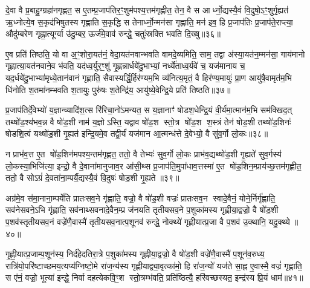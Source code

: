 {\anuvakamend[{द॒भ्नो॒त्यन॑भिषुतस्य गृह्णा॒त्येका॒न्नविꣳ॑श॒तिश्च॑॥९॥}]}

दे॒वा वै प्र॒बाहु॒ग्ग्रहा॑नगृह्णत॒ स ए॒तम्प्र॒जाप॑तिर॒ꣳ॒शुम॑पश्य॒त्तम॑गृह्णीत॒ तेन॒ वै स आर्ध्नो॒द्यस्यै॒वं वि॒दुषो॒ऽꣳ॒शुर्गृ॒ह्यत॑ ऋ॒ध्नोत्ये॒व स॒कृद॑भिषुतस्य गृह्णाति स॒कृद्धि स तेनार्ध्नो॒न्मन॑सा गृह्णाति॒ मन॑ इव॒ हि प्र॒जाप॑तिः प्र॒जाप॑ते॒राप्त्या॒ औदु॑म्बरेण गृह्णा॒त्यूर्ग्वा उ॑दु॒म्बर॒ ऊर्ज॑मे॒वाव॑ रुन्द्धे॒ चतुः॑स्रक्ति भवति दि॒ख्षु॥३६॥

ए॒व प्रति॑ तिष्ठति॒ यो वा अ॒ꣳ॒शोरा॒यत॑नं॒ वेदा॒यत॑नवान्भवति वामदे॒व्यमिति॒ साम॒ तद्वा अ॑स्या॒यत॑न॒म्मन॑सा॒ गाय॑मानो गृह्णात्या॒यत॑नवाने॒व भ॑वति॒ यद॑ध्व॒र्युर॒ꣳ॒शुं गृ॒ह्णन्नार्धये॑दु॒भाभ्यां॒ नर्ध्ये॑ताध्व॒र्यवे॑ च॒ यज॑मानाय च॒ यद॒र्धये॑दु॒भाभ्या॑मृध्ये॒तान॑वानं गृह्णाति॒ सैवास्यर्द्धि॒र्\mbox{}हिर॑ण्यम॒भि व्य॑नित्य॒मृतं॒ वै हिर॑ण्य॒मायुः॑ प्रा॒ण आयु॑षै॒वामृत॑म॒भि धि॑नोति श॒तमा॑नम्भवति श॒तायुः॒ पुरु॑षः श॒तेन्द्रि॑य॒ आयु॑ष्ये॒वेन्द्रि॒ये प्रति॑ तिष्ठति॥३७॥

{\anuvakamend[{दि॒क्ष्व॑निति विश॒तिश्च॑॥10॥}]}

प्र॒जाप॑तिर्दे॒वेभ्यो॑ य॒ज्ञान्व्यादि॑श॒त्स रि॑रिचा॒नो॑ऽमन्यत॒ स य॒ज्ञानाꣳ॑ षोडश॒धेन्द्रि॒यं वी॒र्य॑मा॒त्मान॑म॒भि सम॑क्खिद॒त् तथ्षो॑ड॒श्य॑भव॒न्न वै षो॑ड॒शी नाम॑ य॒ज्ञोऽस्ति॒ यद्वाव षो॑ड॒श स्तो॒त्र षो॑ड॒श श॒स्त्रं तेन॑ षोड॒शी तथ्षो॑ड॒शिनः॑ षोडशि॒त्वं यथ्षो॑ड॒शी गृ॒ह्यत॑ इन्द्रि॒यमे॒व तद्वी॒र्यं॑ यज॑मान आ॒त्मन्ध॑त्ते दे॒वेभ्यो॒ वै सु॑व॒र्गो लो॒कः॥३८॥

न प्राभ॑व॒त्त ए॒त षो॑ड॒शिन॑मपश्य॒न्तम॑गृह्णत॒ ततो॒ वै तेभ्यः॑ सुव॒र्गो लो॒कः प्राभ॑व॒द्यथ्षो॑ड॒शी गृ॒ह्यते॑ सुव॒र्गस्य॑ लो॒कस्या॒भिजि॑त्या॒ इन्द्रो॒ वै दे॒वाना॑मानुजाव॒र आ॑सी॒थ्स प्र॒जाप॑ति॒मुपा॑धाव॒त्तस्मा॑ ए॒त षो॑ड॒शिन॒म्प्राय॑च्छ॒त्तम॑गृह्णीत॒ ततो॒ वै सोऽग्रं॑ दे॒वता॑ना॒म्पर्यै॒द्यस्यै॒वं वि॒दुषः॑ षोड॒शी गृ॒ह्यते॥३९॥

अग्र॑मे॒व स॑मा॒नाना॒म्पर्ये॑ति प्रातःसव॒ने गृ॑ह्णाति॒ वज्रो॒ वै षो॑ड॒शी वज्रः॑ प्रातःसव॒न स्वादे॒वैनं॒ योने॒र्निर्गृ॑ह्णाति॒ सव॑नेसवने॒ऽभि गृ॑ह्णाति॒ सव॑नाथ्सवनादे॒वैन॒म्प्र ज॑नयति तृतीयसव॒ने प॒शुका॑मस्य गृह्णीया॒द्वज्रो॒ वै षो॑ड॒शी प॒शव॑स्तृतीयसव॒नं वज्रे॑णै॒वास्मै॑ तृतीयसव॒नात्प॒शूनव॑ रुन्द्धे॒ नोक्थ्ये॑ गृह्णीयात्प्र॒जा वै प॒शव॑ उ॒क्थानि॒ यदु॒क्थ्ये॥४०॥

गृ॒ह्णी॒यात्प्र॒जाम्प॒शून॑स्य॒ निर्द॑हेदतिरा॒त्रे प॒शुका॑मस्य गृह्णीया॒द्वज्रो॒ वै षो॑ड॒शी वज्रे॑णै॒वास्मै॑ प॒शून॑व॒रुध्य॒ रात्रि॑यो॒परि॑ष्टाच्छमय॒त्यप्य॑ग्निष्टो॒मे रा॑ज॒न्य॑स्य गृह्णीयाद्व्या॒वृत्का॑मो॒ हि रा॑ज॒न्यो॑ यज॑ते सा॒ह्न ए॒वास्मै॒ वज्रं॑ गृह्णाति॒ स ए॑नं॒ वज्रो॒ भूत्या॑ इन्द्धे॒ निर्वा दहत्येकवि॒ꣳ॒श स्तो॒त्रम्भ॑वति॒ प्रति॑ष्ठित्यै॒ हरि॑वच्छस्यत॒ इन्द्र॑स्य प्रि॒यं धाम॑॥४१॥

